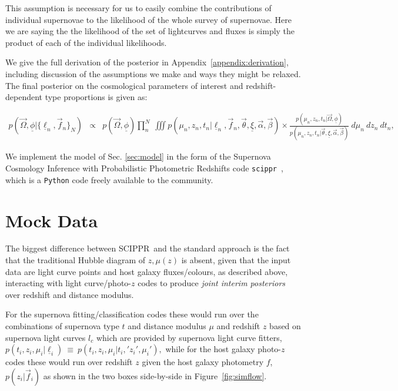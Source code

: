 \documentclass[12pt, twocolumn]{emulateapj}
\newcommand{\textul}{\underline}
\newcommand{\scippr}{\texttt{scippr}~}
\newcommand{\SCIPPR}{\textsc{SCIPPR}~}
\begin{document}
This assumption is necessary for us to easily combine the contributions of individual supernovae to the likelihood of the whole survey of supernovae. 
Here we are saying the the likelihood of the set of lightcurves and fluxes is simply the product of each of the individual likelihoods.

We give the full derivation of the posterior in Appendix~\ref{appendix:derivation}, including discussion of the assumptions we make and ways they might be relaxed. 
The final posterior on the cosmological parameters of interest and redshift-dependent type proportions is given as:

\begin{widetext}

\begin{eqnarray}
\label{eq:wrapupmain}
p(\vec{\Omega}, \textul{\phi} | \{\textul{\ell}_{n}, \vec{f}_{n}\}_{N}) &\propto& p(\vec{\Omega}, \textul{\phi}) \prod_{n}^{N}\ \iiint p(\mu_{n}, z_{n}, t_{n} | \textul{\ell}_{n}, \vec{f}_{n}, \vec{\theta}, \textul{\xi}, \vec{\alpha}, \vec{\beta}) \times \frac{p(\mu_{n}, z_{n}, t_{n} | \vec{\Omega}, \textul{\phi})}{p(\mu_{n}, z_{n}, t_{n} | \vec{\theta}, \textul{\xi}, \vec{\alpha}, \vec{\beta})}\ d\mu_{n}\ dz_{n}\ dt_{n},
\end{eqnarray}
\end{widetext}

We implement the model of Sec. \ref{sec:model} in the form of the Supernova Cosmology Inference with Probabilistic Photometric Redshifts code \scippr, which is a \texttt{Python} code freely available to the community. 


\section{Mock Data}
\label{sec:data}
The biggest difference between \SCIPPR and the standard approach is the fact that the traditional Hubble diagram of $z, \mu(z)$ is absent, given that the input data are light curve points and host galaxy fluxes/colours, as described above, interacting with light curve/photo-$z$ codes to produce \textit{joint interim posteriors} over redshift and distance modulus.

For the supernova fitting/classification codes these would run over the combinations of supernova type $t$ and distance modulus $\mu$ and redshift $z$ based on supernova light curves $l_c$ which are provided by supernova light curve fitters, $p(t_{i}, z_{i}, \mu_{i} | \textul{\ell}_{i})\ \equiv\ p(t_{i}, z_{i}, \mu_{i} | t_{i},' z_{i}', \mu_{i}'),$ while for the host galaxy photo-$z$ codes these would run over redshift $z$ given the host galaxy photometry $f$, $p(z_{i} | \vec{f}_{i})$ as shown in the two boxes side-by-side in Figure~\ref{fig:simflow}.  
\end{document}
